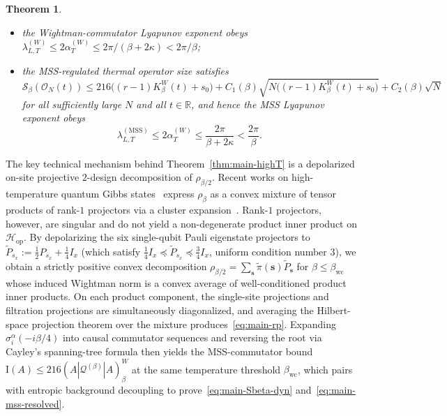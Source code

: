 \documentclass[11pt,a4paper]{article}
\numberwithin{equation}{section}
\theoremstyle{plain}
\newtheorem{theorem}{Theorem}[section]
\theoremstyle{definition}
\newcommand{\Hop}{\mathcal{H}_{\mathrm{op}}}
\newcommand{\MSS}{\mathrm{MSS}}
\begin{document}
\begin{theorem}
\begin{enumerate}
  \begin{itemize}
    \setlength{\itemsep}{2pt}\setlength{\parskip}{0pt}
    \item the Wightman-commutator Lyapunov exponent obeys $\lambda_{L,T}^{(W)} \le 2\alpha_T^{(W)} \le 2\pi/(\beta+2\kappa) < 2\pi/\beta$;
    \item the MSS-regulated thermal operator size satisfies
    \begin{equation}\label{eq:main-Sbeta-dyn}
      \mathcal{S}_\beta(\mathcal{O}_N(t)) \le 216\bigl((r-1)K_\beta^W(t)+s_0\bigr) + C_1(\beta)\sqrt{N\bigl((r-1)K_\beta^W(t)+s_0\bigr)} + C_2(\beta)\sqrt{N}
    \end{equation}
    for all sufficiently large $N$ and all $t\in\mathbb{R}$, and hence the MSS Lyapunov exponent obeys
    \begin{equation}\label{eq:main-mss-resolved}
      \lambda_{L,T}^{(\MSS)} \le 2\alpha_T^{(W)} \le \frac{2\pi}{\beta+2\kappa} < \frac{2\pi}{\beta}.
    \end{equation}
  \end{itemize}
\end{enumerate}
\end{theorem}

The key technical mechanism behind Theorem~\ref{thm:main-highT} is a depolarized on-site projective $2$-design decomposition of $\rho_{\beta/2}$. Recent works on high-temperature quantum Gibbs states~\cite{Bakshi2024,Kim2026} express $\rho_\beta$ as a convex mixture of tensor products of rank-$1$ projectors via a cluster expansion~\cite{Kotecky1986,Ueltschi2004}. Rank-$1$ projectors, however, are singular and do not yield a non-degenerate product inner product on $\Hop$. By depolarizing the six single-qubit Pauli eigenstate projectors to $\widetilde{P}_{s_x} := \frac{1}{2}P_{s_x} + \frac{1}{4}I_x$ (which satisfy $\frac{1}{4}I_x \preceq \widetilde{P}_{s_x} \preceq \frac{3}{4}I_x$, uniform condition number $3$), we obtain a strictly positive convex decomposition $\rho_{\beta/2} = \sum_{\mathbf{s}}\widetilde{\pi}(\mathbf{s})\widetilde{P}_{\mathbf{s}}$ for $\beta\le\beta_{\mathrm{wc}}$ whose induced Wightman norm is a convex average of well-conditioned product inner products. On each product component, the single-site projections and filtration projections are simultaneously diagonalized, and averaging the Hilbert-space projection theorem over the mixture produces~\eqref{eq:main-rp}. Expanding $\sigma_i^\alpha(-i\beta/4)$ into causal commutator sequences and reversing the root via Cayley's spanning-tree formula then yields the MSS-commutator bound $\mathrm{I}(A)\le 216(A|\mathcal{Q}^{(\beta)}|A)_\beta^W$ at the same temperature threshold $\beta_{\mathrm{wc}}$, which pairs with entropic background decoupling to prove~\eqref{eq:main-Sbeta-dyn} and~\eqref{eq:main-mss-resolved}.
\end{document}
